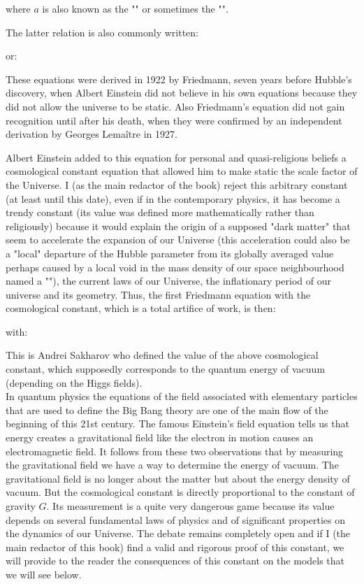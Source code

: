 	where $a$ is also known as the "" or sometimes the "".
	
	The latter relation is also commonly written:
	
	or:
	
	These equations were derived in 1922 by Friedmann, seven years before Hubble's discovery, when Albert Einstein did not believe in his own equations because they did not allow the universe to be static. Also Friedmann's equation did not gain recognition until after his death, when they were confirmed by an independent derivation by Georges Lemaître in 1927.
	
	\begin{tcolorbox}[title=Remark,colframe=black,arc=10pt]
	Albert Einstein added to this equation for personal and quasi-religious beliefs a cosmological constant equation that allowed him to make static the scale factor of the Universe. I (as the main redactor of the book) reject this arbitrary constant (at least until this date), even if in the contemporary physics, it has become a trendy constant (its value was defined more mathematically rather than religiously) because it would explain the origin of a supposed "dark matter" that seem to accelerate the expansion of our Universe (this acceleration could also be a "local" departure of the Hubble parameter from its globally averaged value perhaps caused by a local void in the mass density of our space neighbourhood named a ""), the current laws of our Universe, the inflationary period of our universe and its geometry. Thus, the first Friedmann equation with the cosmological constant, which is a total artifice of work, is then: 
	
	with:
	
	This is Andrei Sakharov who defined the value of the above cosmological constant, which supposedly corresponds to the quantum energy of vacuum (depending on the Higgs fields).\\
	
	In quantum physics the equations of the field associated with elementary particles that are used to define the Big Bang theory are one of the main flow of the beginning of this 21st century. The famous Einstein's field equation tells us that energy creates a gravitational field like the electron in motion causes an electromagnetic field. It follows from these two observations that by measuring the gravitational field we have a way to determine the energy of vacuum. The gravitational field is no longer about the matter but about the energy density of vacuum. But the cosmological constant is directly proportional to the constant of gravity $G$. Its measurement is a quite very dangerous game because its value depends on several fundamental laws of physics and of significant properties on the dynamics of our Universe. The debate remains completely open and if I (the main redactor of this book) find a valid and rigorous proof of this constant, we will provide to the reader the  consequences of this constant on the models that we will see below.
	\end{tcolorbox}
